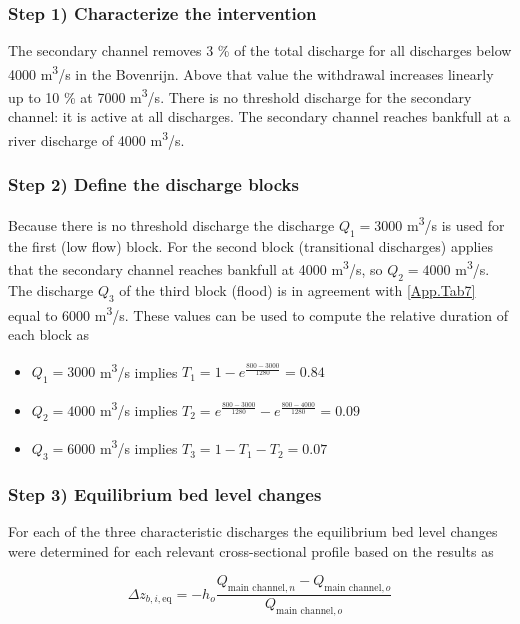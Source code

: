 \subsubsection*{Step 1) Characterize the intervention}

The secondary channel removes 3 \% of the total discharge for all discharges below 4000 m\textsuperscript{3}/s in the Bovenrijn.
Above that value the withdrawal increases linearly up to 10 \% at 7000 m\textsuperscript{3}/s.
There is no threshold discharge for the secondary channel: it is active at all discharges.
The secondary channel reaches bankfull at a river discharge of 4000 m\textsuperscript{3}/s.

\subsubsection*{Step 2) Define the discharge blocks}

Because there is no threshold discharge the discharge $Q_1 = 3000$ m\textsuperscript{3}/s is used for the first (low flow) block.
For the second block (transitional discharges) applies that the secondary channel reaches bankfull at 4000 m\textsuperscript{3}/s, so $Q_2 = 4000$ m\textsuperscript{3}/s.
The discharge $Q_3$ of the third block (flood) is in agreement with \autoref{App.Tab7} equal to 6000 m\textsuperscript{3}/s.
These values can be used to compute the relative duration of each block as

\begin{itemize}
\item $Q_1=3000$ m\textsuperscript{3}/s implies $T_1 = 1-e^{\frac{800-3000}{1280}} = 0.84$
\item $Q_2=4000$ m\textsuperscript{3}/s implies $T_2 = e^{\frac{800-3000}{1280}} - e^{\frac{800-4000}{1280}} = 0.09$
\item $Q_3=6000$ m\textsuperscript{3}/s implies $T_3 = 1-T_1-T_2 = 0.07$
\end{itemize}

\subsubsection*{Step 3) Equilibrium bed level changes}

For each of the three characteristic discharges the equilibrium bed level changes were determined for each relevant cross-sectional profile based on the \sobek results as

\begin{equation}
\Delta z_{b,i,\text{eq}} = -h_o \frac{Q_{\text{main channel},n} - Q_{\text{main channel},o}}{Q_{\text{main channel},o}}
\end{equation}


